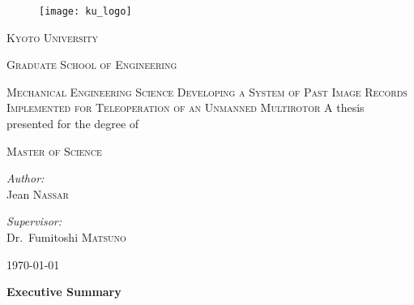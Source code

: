 \begin{titlepage}
  \begin{center}
    \noindent

    \begin{figure}[h]
      \centering
      \texttt{[image: ku\_logo]}
    \end{figure}
    \textsc{\LARGE Kyoto University}
    
    \textsc{\Large Graduate School of Engineering}

    \textsc{\large Mechanical Engineering Science}
    \vfill\vfill
    \textsc{\large Developing a System of Past Image Records Implemented for Teleoperation of an Unmanned Multirotor}  %
    \vfill\vfill
    {\large A thesis presented for the degree of}

    \textsc{\large Master of Science}
    \vfill\vfill
    \begin{minipage}[t]{0.4\textwidth}
      \begin{flushleft}
	\emph{Author:}\\
	Jean \textsc{Nassar}
      \end{flushleft}
    \end{minipage}
    \begin{minipage}[t]{0.4\textwidth}
      \begin{flushright}
	\emph{Supervisor:}\\
	Dr.~Fumitoshi \textsc{Matsuno}
      \end{flushright}
    \end{minipage}
    \vfill
    \today
  \end{center}
\end{titlepage}


\thispagestyle{empty}
  \null{}
    \begin{flushright}
    \end{flushright}
  \null

\newcommand\summaryname{Executive Summary}
\newenvironment{summary}%
  {\cleardoublepage\thispagestyle{empty}%
    \null\vfill%
    \begin{center}%
      \bfseries \summaryname
    \end{center}}%
  \vfill\null
  \begin{summary}
    \lipsum[1-3]
  \end{summary}

